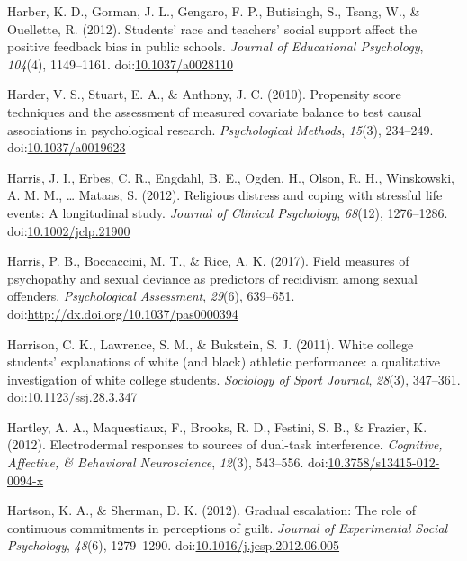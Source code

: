 \documentclass[english,man]{apa6}
\theoremstyle{definition}
\theoremstyle{definition}
\theoremstyle{definition}
\theoremstyle{remark}
\begin{document}
\hypertarget{ref-Harber2012}{}
Harber, K. D., Gorman, J. L., Gengaro, F. P., Butisingh, S., Tsang, W.,
\& Ouellette, R. (2012). Students' race and teachers' social support
affect the positive feedback bias in public schools. \emph{Journal of
Educational Psychology}, \emph{104}(4), 1149--1161.
doi:\href{https://doi.org/10.1037/a0028110}{10.1037/a0028110}

\hypertarget{ref-Harder2010}{}
Harder, V. S., Stuart, E. A., \& Anthony, J. C. (2010). Propensity score
techniques and the assessment of measured covariate balance to test
causal associations in psychological research. \emph{Psychological
Methods}, \emph{15}(3), 234--249.
doi:\href{https://doi.org/10.1037/a0019623}{10.1037/a0019623}

\hypertarget{ref-Harris2012}{}
Harris, J. I., Erbes, C. R., Engdahl, B. E., Ogden, H., Olson, R. H.,
Winskowski, A. M. M., \ldots{} Mataas, S. (2012). Religious distress and
coping with stressful life events: A longitudinal study. \emph{Journal
of Clinical Psychology}, \emph{68}(12), 1276--1286.
doi:\href{https://doi.org/10.1002/jclp.21900}{10.1002/jclp.21900}

\hypertarget{ref-Harris2017}{}
Harris, P. B., Boccaccini, M. T., \& Rice, A. K. (2017). Field measures
of psychopathy and sexual deviance as predictors of recidivism among
sexual offenders. \emph{Psychological Assessment}, \emph{29}(6),
639--651.
doi:\href{https://doi.org/http://dx.doi.org/10.1037/pas0000394}{http://dx.doi.org/10.1037/pas0000394}

\hypertarget{ref-Harrison2011}{}
Harrison, C. K., Lawrence, S. M., \& Bukstein, S. J. (2011). White
college students' explanations of white (and black) athletic
performance: a qualitative investigation of white college students.
\emph{Sociology of Sport Journal}, \emph{28}(3), 347--361.
doi:\href{https://doi.org/10.1123/ssj.28.3.347}{10.1123/ssj.28.3.347}

\hypertarget{ref-Hartley2012}{}
Hartley, A. A., Maquestiaux, F., Brooks, R. D., Festini, S. B., \&
Frazier, K. (2012). Electrodermal responses to sources of dual-task
interference. \emph{Cognitive, Affective, \& Behavioral Neuroscience},
\emph{12}(3), 543--556.
doi:\href{https://doi.org/10.3758/s13415-012-0094-x}{10.3758/s13415-012-0094-x}

\hypertarget{ref-Hartson2012}{}
Hartson, K. A., \& Sherman, D. K. (2012). Gradual escalation: The role
of continuous commitments in perceptions of guilt. \emph{Journal of
Experimental Social Psychology}, \emph{48}(6), 1279--1290.
doi:\href{https://doi.org/10.1016/j.jesp.2012.06.005}{10.1016/j.jesp.2012.06.005}
\end{document}
